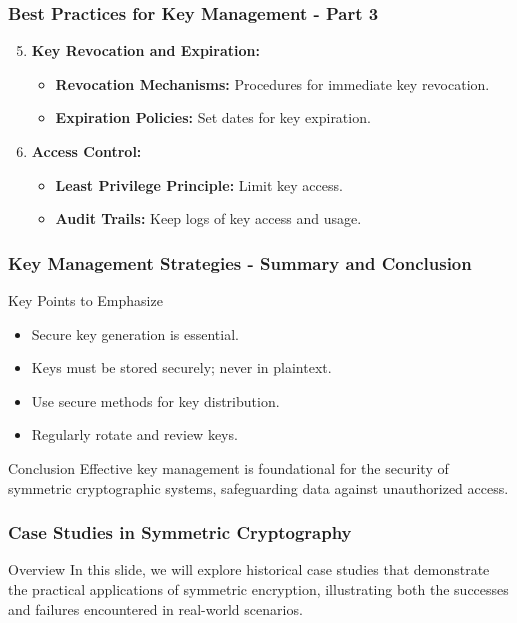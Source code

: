 \documentclass{beamer}
\begin{document}
\begin{frame}
    \frametitle{Best Practices for Key Management - Part 3}
    \begin{enumerate}
        \setcounter{enumi}{4}
        \item \textbf{Key Revocation and Expiration:}
            \begin{itemize}
                \item \textbf{Revocation Mechanisms:} Procedures for immediate key revocation.
                \item \textbf{Expiration Policies:} Set dates for key expiration.
            \end{itemize}
        \item \textbf{Access Control:}
            \begin{itemize}
                \item \textbf{Least Privilege Principle:} Limit key access.
                \item \textbf{Audit Trails:} Keep logs of key access and usage.
            \end{itemize}
    \end{enumerate}
\end{frame}

\begin{frame}
    \frametitle{Key Management Strategies - Summary and Conclusion}
    \begin{block}{Key Points to Emphasize}
        \begin{itemize}
            \item Secure key generation is essential.
            \item Keys must be stored securely; never in plaintext.
            \item Use secure methods for key distribution.
            \item Regularly rotate and review keys.
        \end{itemize}
    \end{block}
    \begin{block}{Conclusion}
        Effective key management is foundational for the security of symmetric cryptographic systems, safeguarding data against unauthorized access.
    \end{block}
\end{frame}

\begin{frame}[fragile]
    \frametitle{Case Studies in Symmetric Cryptography}
    \begin{block}{Overview}
        In this slide, we will explore historical case studies that demonstrate the practical applications of symmetric encryption, illustrating both the successes and failures encountered in real-world scenarios.
    \end{block}
\end{frame}
\end{document}
